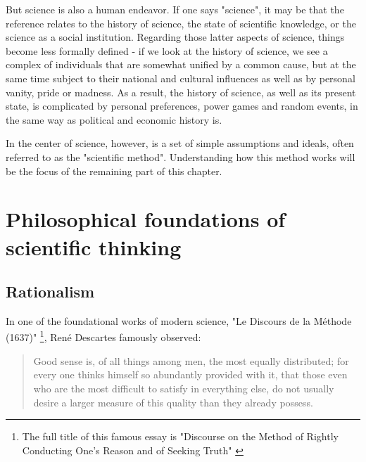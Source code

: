 \documentclass{tufte-book}
\begin{document}

But science is also a human endeavor. If one says "science", it may be that the reference relates to the history of science, the state of scientific knowledge, or the science as a social institution. Regarding those latter aspects of science, things become less formally defined - if we look at the history of science, we see a complex of individuals that are somewhat unified by a common cause, but at the same time subject to their national and cultural influences as well as by personal vanity, pride or madness. As a result, the history of science, as well as its present state, is complicated by personal preferences, power games and random events, in the same way as political and economic history is.

In the center of science, however, is a set of simple assumptions and ideals, often referred to as the "scientific method". Understanding how this method works will be the focus of the remaining part of this chapter.


\section{Philosophical foundations of scientific thinking}


\subsection{Rationalism}


In one of the foundational works of modern science, "Le Discours de la Méthode (1637)"  \footnote{The full title of this famous essay is "Discourse on the Method of Rightly Conducting One's Reason and of Seeking Truth" \citep{Descartes-DiscourseMethodRightly-1673}}, René Descartes famously observed: 

\begin{quote}
Good sense is, of all things among men, the most equally distributed; for every one thinks himself so abundantly provided with it, that those even who are the most difficult to satisfy in everything else, do not usually desire a larger measure of this quality than they already possess.
\end{quote}
\end{document}
